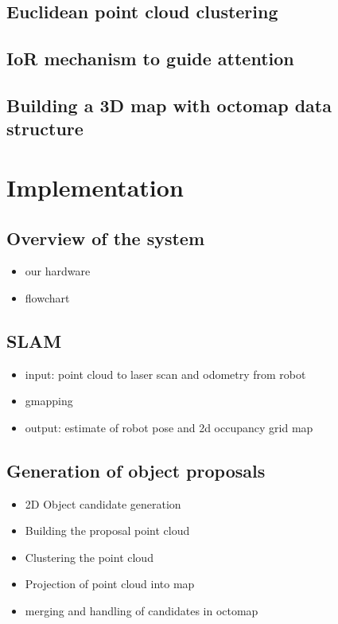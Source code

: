 \documentclass[a4paper,11pt,english]{article}
\begin{document}
\subsection{Euclidean point cloud clustering}
\subsection{IoR mechanism to guide attention}
\subsection{Building a 3D map with octomap data structure}

\section{Implementation}

\subsection{Overview of the system}
\begin{itemize}
	\item our hardware
	\item flowchart
\end{itemize}

\subsection{SLAM}
\begin{itemize}
	\item input: point cloud to laser scan and odometry from robot
	\item gmapping
	\item output: estimate of robot pose and 2d occupancy grid map
\end{itemize}

\subsection{Generation of object proposals}

\begin{itemize}
	\item 2D Object candidate generation
	\item Building the proposal point cloud
	\item Clustering the point cloud
	\item Projection of point cloud into map
	\item merging and handling of candidates in octomap
\end{itemize}
\end{document}
